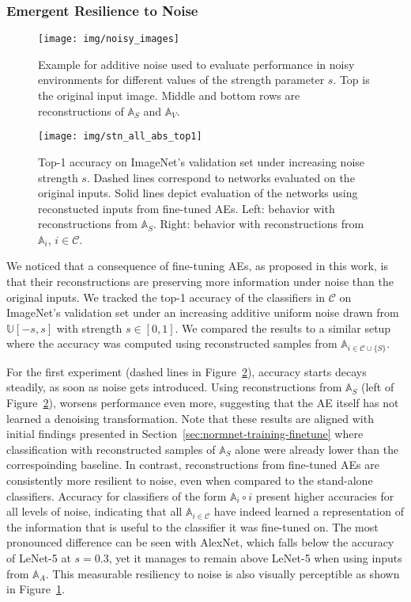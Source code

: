 \documentclass[10pt,twocolumn,a4paper]{article}
\newcommand{\autoe}[1]{\mathbb{A}_{#1}}
\newcommand{\clf}[1]{#1}
\newcommand{\nn}[2]{\autoe{#1}\circ\clf{#2}}
\begin{document}
\subsubsection{Emergent Resilience to Noise}\begin{figure}
	\centering
	\texttt{[image: img/noisy\_images]}
	\caption{Example for additive noise used to evaluate performance in noisy environments for different values of the strength parameter $s$. Top is the original input image. Middle and bottom rows are reconstructions of $\autoe{S}$ and $\autoe{V}$.}
	\label{fig:noisy-images}
\end{figure}\begin{figure}
	\texttt{[image: img/stn\_all\_abs\_top1]}
	\caption{Top-1 accuracy on ImageNet's validation set under increasing noise strength $s$. Dashed lines correspond to networks evaluated on the original inputs. Solid lines depict evaluation of the networks using reconstucted inputs from fine-tuned AEs. Left: behavior with reconstructions from $\autoe{S}$. Right: behavior with reconstructions from $\autoe{i}$, $i \in \mathcal{C}$.}
	\label{fig:noisy-accuracy}
\end{figure}
We noticed that a consequence of fine-tuning AEs, as proposed in this work, is that their reconstructions are preserving more information under noise than the original inputs.
We tracked the top-1 accuracy of the classifiers in $\mathcal{C}$ on ImageNet's validation set under an increasing additive uniform noise drawn from $\mathbb{U}[-s, s]$ with strength $s\in [0, 1]$.
We compared the results to a similar setup where the accuracy was computed using reconstructed samples from $\autoe{i \in \mathcal{C} \cup \{S\}}$.

For the first experiment (dashed lines in Figure~\ref{fig:noisy-accuracy}), accuracy starts decays steadily, as soon as noise gets introduced.
Using reconstructions from $\autoe{S}$ (left of Figure~\ref{fig:noisy-accuracy}), worsens performance even more, suggesting that the AE itself has not learned a denoising transformation.
Note that these results are aligned with initial findings presented in Section~\ref{sec:normnet-training-finetune} where classification with reconstructed samples of $\autoe{S}$ alone were already lower than the correspoinding baseline.
In contrast, reconstructions from fine-tuned AEs are consistently more resilient to noise, even when compared to the stand-alone classifiers.
Accuracy for classifiers of the form $\nn{i}{i}$ present higher accuracies for all levels of noise, indicating that all $\autoe{i \in \mathcal{C}}$ have indeed learned a representation of the information that is useful to the classifier it was fine-tuned on.
The most pronounced difference can be seen with AlexNet, which falls below the accuracy of LeNet-5 at $s=0.3$, yet it manages to remain above LeNet-5 when using inputs from $\mathbb{A}_A$.
This measurable resiliency to noise is also visually perceptible as shown in Figure~\ref{fig:noisy-images}.
\end{document}
